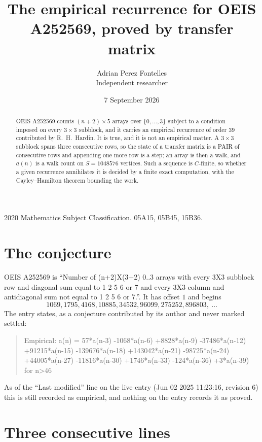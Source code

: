 \documentclass[11pt,a4paper]{article}
\title{The empirical recurrence for OEIS A252569, proved by transfer matrix}
\author{Adrian Perez Fontelles\\ \small Independent researcher}
\date{7 September 2026}
\theoremstyle{plain}
\theoremstyle{definition}
\begin{document}
\maketitle

\begin{abstract}
OEIS A252569 counts $(n+2)\times5$ arrays over $\{0,\dots,3\}$ subject to a condition imposed on
every $3\times3$ subblock, and it carries an empirical recurrence of order $39$
contributed by R.~H.~Hardin. It is true, and it is not an empirical matter. A $3\times3$
subblock spans three consecutive rows, so the state of a transfer matrix is a PAIR of
consecutive rows and appending one more row is a step; an array is then a walk, and
$a(n)$ is a walk count on $S=1048576$ vertices. Such a sequence is $C$-finite, so whether a given
recurrence annihilates it is decided by a finite exact computation, with the Cayley--Hamilton
theorem bounding the work.
\end{abstract}

\noindent\small 2020 Mathematics Subject Classification. 05A15, 05B45, 15B36.\normalsize

\section{The conjecture}

OEIS A252569 is ``Number of (n+2)X(3+2) 0..3 arrays with every 3X3 subblock row and diagonal sum equal to 1 2 5 6 or 7 and every 3X3 column and antidiagonal sum not equal to 1 2 5 6 or 7.''. It has offset $1$ and begins
\[
1069, 1795, 4168, 10885, 34532, 96099, 275252, 896803,\ \dots
\]
The entry states, as a conjecture contributed by its author and never marked settled:
\begin{quote}
Empirical: a(n) = 57*a(n-3) -1068*a(n-6) +8828*a(n-9) -37486*a(n-12) +91215*a(n-15) -139676*a(n-18) +143042*a(n-21) -98725*a(n-24) +44005*a(n-27) -11816*a(n-30) +1746*a(n-33) -124*a(n-36) +3*a(n-39) for n>46
\end{quote}
As of the ``Last modified'' line on the live entry (Jun 02 2025 11:23:16, revision 6) this is still
recorded as empirical, and nothing on the entry records it as proved.

\section{Three consecutive lines}
\end{document}
